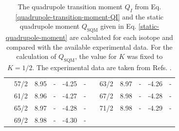 \begin{table}
{\begin{tabular}{|c|c|c|c|c|c|c|ccccc|}
    & 57/2 & 8.95 & - & -4.25 & - &  & \multicolumn{1}{c|}{63/2} & \multicolumn{1}{c|}{8.97} & \multicolumn{1}{c|}{-} & \multicolumn{1}{c|}{-4.26} & - \\ \cline{2-6} \cline{8-12} 
    & 61/2 & 8.96 & - & -4.27 & - &  & \multicolumn{1}{c|}{67/2} & \multicolumn{1}{c|}{8.98} & \multicolumn{1}{c|}{-} & \multicolumn{1}{c|}{-4.28} & - \\ \cline{2-6} \cline{8-12} 
    & 65/2 & 8.97 & - & -4.28 & - &  & \multicolumn{1}{c|}{71/2} & \multicolumn{1}{c|}{8.98} & \multicolumn{1}{c|}{-} & \multicolumn{1}{c|}{-4.29} & - \\ \cline{2-6} \cline{8-12} 
    & 69/2 & 8.98 & - & -4.30 & - &  & \multicolumn{5}{c|}{} \\ \hline
    \end{tabular}%
    }
    \caption{The quadrupole transition moment $Q_I$ from Eq. \ref{quadrupole-transition-moment-QI} and the static quadrupole moment $Q_\text{SQM}$ given in Eq. \ref{static-quadrupole-moment} are calculated for each isotope and compared with the available experimental data. For the calculation of $Q_\text{SQM}$, the value for $K$ was fixed to $K=1/2$. The experimental data are taken from Refs. \cite{gorgen2004quadrupole,jensen2002wobbling,reich2010nuclear}.}
    \label{table-quadrupole-QI-QSQM-numerical-results}
\end{table}

